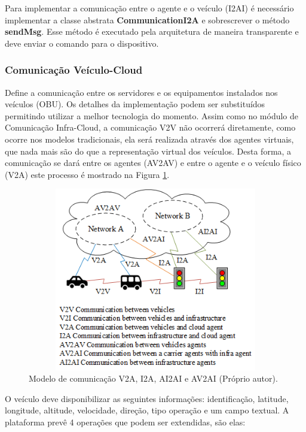 \documentclass[
	12pt,				%
	oneside,			%
	a4paper,			%
	english,			%
	brazil				%
	]{abntex2ppgsi}
\begin{document}
Para implementar a comunicação entre o agente e o veículo (I2AI) é necessário implementar a classe abstrata \textbf{CommunicationI2A} e sobrescrever o método \textbf{sendMsg}. Esse método é executado pela arquitetura de maneira transparente e deve enviar o comando para o dispositivo. 


\subsubsection{Comunicação Veículo-Cloud}

Define a comunicação entre os servidores e os equipamentos instalados nos veículos (OBU). Os detalhes da implementação podem ser substituídos permitindo utilizar a melhor tecnologia do momento. Assim como no módulo de Comunicação Infra-Cloud, a comunicação V2V não ocorrerá diretamente, como ocorre nos modelos tradicionais, ela será realizada através dos agentes virtuais, que nada mais são do que a representação virtual dos veículos. Desta forma, a comunicação se dará entre os agentes (AV2AV) e entre o agente e o veículo físico (V2A) este processo é mostrado na Figura \ref{fig:dComunicacaoAgentes}.
  
\begin{figure}[h!]
	\centering
	\includegraphics [width=12cm,height=8cm] {images/agentemoveis_virtuais.png}
	\caption{Modelo de comunicação V2A, I2A, AI2AI e AV2AI (Próprio autor).}
	\label{fig:dComunicacaoAgentes}
\end{figure}

O veículo deve disponibilizar as seguintes informações: identificação, latitude, longitude, altitude, velocidade, direção, tipo operação e um campo textual. A plataforma prevê 4 operações que podem ser extendidas, são elas:
\end{document}
